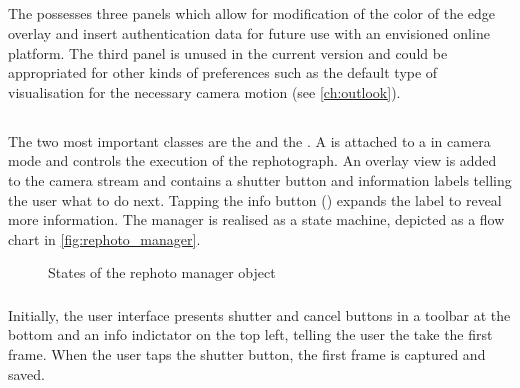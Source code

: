 \subsection{}

The  possesses three panels which allow for
modification of the color of the edge overlay and insert authentication data for
future use with an envisioned online platform. The third panel is unused in the current
version and could be appropriated for other kinds of preferences such as the default type
of visualisation for the necessary camera motion (see \autoref{ch:outlook}).


\subsection{}

 The two most
important classes are the  and the
. A  is attached to
a  in camera mode and controls the execution of
the rephotograph. An overlay view is added to the camera stream and contains a
shutter button and information labels telling the user what to do next. Tapping
the info button ()
expands the label to reveal more information. The manager is realised as a state
machine, depicted as a flow chart in \autoref{fig:rephoto_manager}.

\begin{figure}[h]
   {\centering      
      
      \caption{States of the rephoto manager object}
   \label{fig:rephoto_manager}}
\end{figure}

\subsubsection*{}

Initially, the user interface presents shutter and cancel buttons in a toolbar
at the bottom and an info indictator on the top left, telling the user the take
the first frame. When the user taps the shutter button, the first frame is
captured and saved.

